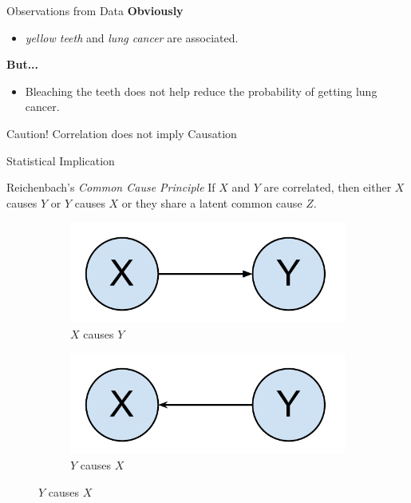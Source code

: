 \begin{frame}{Observations from Data}
\textbf{Obviously}
\begin{itemize}
\item \textit{yellow teeth} and \textit{lung cancer} are associated.
\end{itemize}\pause
\alert{\textbf{But...}}
\begin{itemize}
\item Bleaching the teeth does not help reduce the probability
of getting lung cancer.
\end{itemize}\pause
\begin{alertblock}{Caution!}
Correlation does not imply Causation
\end{alertblock}
\end{frame}
\begin{frame}{Statistical Implication}
\begin{block}{Reichenbach's \textit{Common Cause Principle}}
If $X$ and $Y$ are correlated, then either $X$ causes $Y$ or $Y$ causes $X$ or they share a latent common cause $Z$.
\end{block}
\begin{figure}
\setcounter{subfigure}{0}
	\centering
	\begin{subfigure}[H]{0.3\textwidth}
		\centering
		\includegraphics[scale=0.3]{imgs/x2y}
		\caption{$X$ causes $Y$}
	\end{subfigure}
	\begin{subfigure}[H]{0.3\textwidth}
		\centering
		\includegraphics[scale=0.3]{imgs/y2x}
		\caption{$Y$ causes $X$}

\end{subfigure}
\end{figure}
\end{frame}

